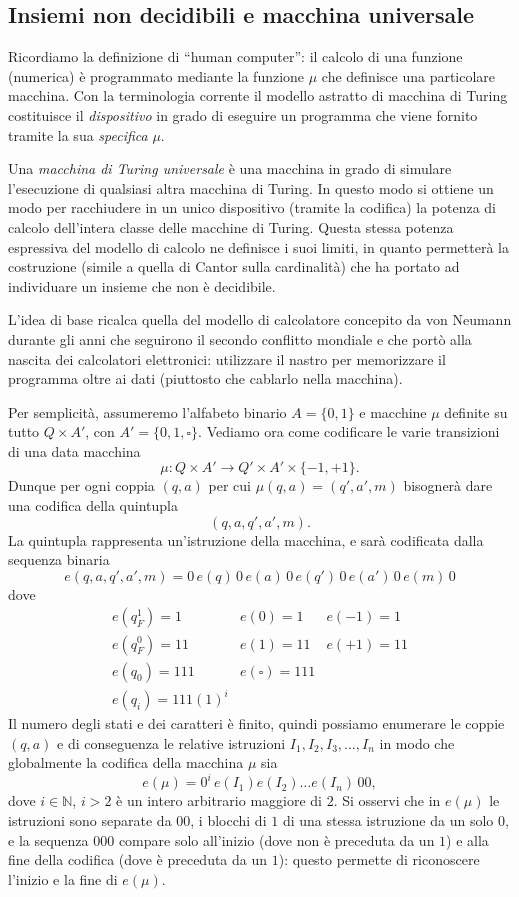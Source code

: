 \subsection{Insiemi non decidibili e macchina universale}

Ricordiamo la definizione di ``human computer'': il calcolo di una funzione (numerica) è programmato mediante la funzione $\mu$ che definisce una particolare macchina. Con la terminologia corrente il modello astratto di macchina di Turing costituisce il \emph{dispositivo} in grado di eseguire un programma che viene fornito tramite la sua \emph{specifica} $\mu$.

Una \emph{macchina di Turing universale} è una macchina in grado di simulare l'esecuzione di qualsiasi altra macchina di Turing. In questo modo si ottiene un modo per racchiudere in un unico dispositivo (tramite la codifica) la potenza di calcolo dell'intera classe delle macchine di Turing. Questa stessa potenza espressiva del modello di calcolo ne definisce i suoi limiti, in quanto permetterà la costruzione (simile a quella di Cantor sulla cardinalità) che ha portato ad individuare un insieme che non è decidibile.

L'idea di base ricalca quella del modello di calcolatore concepito da von Neumann durante gli anni che seguirono il secondo conflitto mondiale e che portò alla nascita dei calcolatori elettronici: utilizzare il nastro per memorizzare il programma oltre ai dati (piuttosto che cablarlo nella macchina).

Per semplicità, assumeremo l'alfabeto binario $A=\{0,1\}$ e macchine $\mu$ definite su tutto $Q\times A'$, con $A'=\{0,1,\square\}$. Vediamo ora come codificare le varie transizioni di una data macchina
\[
\mu\colon Q\times A'\to Q'\times A'\times\{-1,+1\}.
\]
Dunque per ogni coppia $(q,a)$ per cui $\mu(q,a)=(q',a',m)$ bisognerà dare una codifica della quintupla
\[
(q,a,q',a',m).
\]
La quintupla rappresenta un'istruzione della macchina, e sarà codificata dalla sequenza binaria
\[
e(q,a,q',a',m)=0\,e(q)\,0\,e(a)\,0\,e(q')\,0\,e(a')\,0\,e(m)\,0
\]
dove
\[
\begin{array}{lll}
e(q_F^1)=1 & e(0)=1 & e(-1)=1\\
e(q_F^0)=11 & e(1)=11 & e(+1)=11\\
e(q_0)=111 & e(\square)=111 & \\
e(q_i)=111(1)^i & &
\end{array}
\]
Il numero degli stati e dei caratteri è finito, quindi possiamo enumerare le coppie $(q,a)$ e di conseguenza le relative istruzioni $I_1,I_2,I_3,\dots,I_n$ in modo che globalmente la codifica della macchina $\mu$ sia
\[
e(\mu)=0^i\,e(I_1)e(I_2)\dots e(I_n)\,00,
\]
dove $i\in\mathbb N$, $i>2$ è un intero arbitrario maggiore di $2$. Si osservi che in $e(\mu)$ le istruzioni sono separate da $00$, i blocchi di $1$ di una stessa istruzione da un solo $0$, e la sequenza $000$ compare solo all'inizio (dove non è preceduta da un $1$) e alla fine della codifica (dove è preceduta da un $1$): questo permette di riconoscere l'inizio e la fine di $e(\mu)$.

